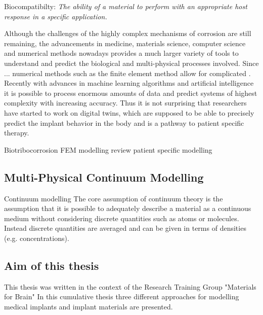 \begin{center}
  \begin{minipage}{0.9\textwidth}
  Biocompatibilty: 
  \textit{
    The ability of a material to perform with an appropriate host response in a specific application.\\
  }
\end{minipage}
\end{center}
Although the challenges of the highly complex mechanisms of corrosion are still remaining, the advancements in medicine, materials science, computer science and numerical methods nowadays provides a much larger variety of tools to understand and predict the biological and multi-physical processes involved. Since ... numerical methods such as the finite element method allow for complicated . Recently with advances in machine learning algorithms and artificial intelligence it is possible to process enormous amounts of data and predict systems of highest complexity with increasing accuracy. Thus it is not surprising that researchers have started to work on digital twins, which are supposed to be able to precisely predict the implant behavior in the body \supercite{cellina_digital_2023} and is a pathway to patient specific therapy.  

Biotribocorrosion
FEM modelling review patient specific modelling \supercite{pankaj_patientspecific_2013}



\subsection{Multi-Physical Continuum Modelling}

Continuum modelling  
The core assumption of continuum theory is the assumption that it is possible to adequately describe a material as a continuous medium without considering discrete quantities such as atoms or molecules. 
 Instead discrete quantities are averaged and can be given in terms of densities (e.g. concentrations). 

\subsection{Aim of this thesis}
This thesis was written in the context of the Research Training Group "Materials for Brain"  
In this cumulative thesis three different approaches for modelling medical implants and implant materials are presented. 



